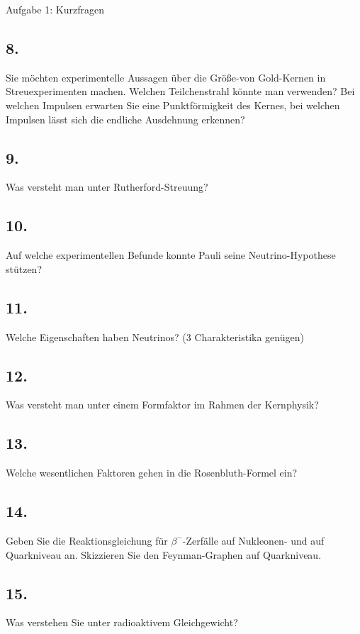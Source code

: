 \begin{aufgabe}{Aufgabe 1: Kurzfragen}
    \subsection{8.}
    Sie möchten experimentelle Aussagen über die Größe-von Gold-Kernen in Streuexperimenten machen.
    Welchen Teilchenstrahl könnte man verwenden?
    Bei welchen Impulsen erwarten Sie eine Punktförmigkeit des Kernes,
    bei welchen Impulsen lässt sich die endliche Ausdehnung erkennen?

    \subsection{9.}
    Was versteht man unter Rutherford-Streuung?

    \subsection{10.}
    Auf welche experimentellen Befunde konnte Pauli seine Neutrino-Hypothese stützen?

    \subsection{11.}
    Welche Eigenschaften haben Neutrinos?
    (3 Charakteristika genügen)

    \subsection{12.}
    Was versteht man unter einem Formfaktor im Rahmen der Kernphysik?

    \subsection{13.}
    Welche wesentlichen Faktoren gehen in die Rosenbluth-Formel ein?

    \subsection{14.}
    Geben Sie die Reaktionsgleichung für $\beta^-$-Zerfälle auf Nukleonen- und auf Quarkniveau an.
    Skizzieren Sie den Feynman-Graphen auf Quarkniveau.

    \subsection{15.}
    Was verstehen Sie unter radioaktivem Gleichgewicht?


\end{aufgabe}
